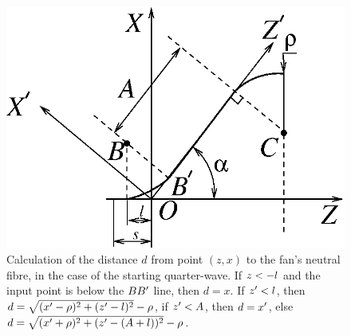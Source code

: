 \begin{figure}
\centering
\includegraphics{bqwave_prime.eps}
\caption{Calculation of the distance $d$ from point $(z, x)$ to the
fan's neutral fibre, in the case of the starting quarter-wave.
If $z < -l\/$ and the input point is below the $BB^{\prime}\/$ line, then $d = x$.
If $z^{\prime} < l\/$, then $d =
\sqrt{(x^{\prime}-\rho)^2 + (z^{\prime}-l)^2} - 
\rho\/$, if $z^{\prime}< A\/$, then  $d=x^{\prime}\/$,
else $d = \sqrt{(x^{\prime} + \rho)^2 +
(z^{\prime}-(A + l))^2} - \rho\/$. } 
\label{bqwave_prime}
\end{figure}
